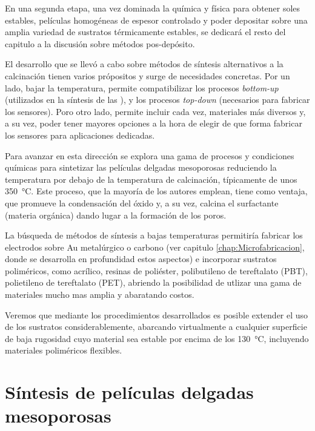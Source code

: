 	En una segunda etapa, una vez dominada la química y física para obtener soles estables, películas homogéneas de espesor controlado y poder depositar sobre una amplia variedad de sustratos térmicamente estables, se dedicará el resto del capitulo a la discusión sobre métodos pos-depósito. 

	El desarrollo que se llevó a cabo sobre métodos de síntesis alternativos a la calcinación tienen varios própositos y surge de necesidades concretas. Por un lado, bajar la temperatura, permite compatibilizar los procesos \textit{bottom-up} (utilizados en la síntesis de las \pdm), y los procesos \textit{top-down} (necesarios para fabricar los sensores). Poro otro lado, permite incluir cada vez, materiales más diversos y, a su vez, poder tener mayores opciones a la hora de elegir de que forma fabricar los sensores para aplicaciones dedicadas\cite{Doshi2000a,Wagner2013,Innocenzi2013,Soler-Illia2002a}.

	Para avanzar en esta dirección se explora una gama de procesos y condiciones químicas para sintetizar las películas delgadas mesoporosas reduciendo la temperatura por debajo de la temperatura de calcinación, típicamente de unos \SI{350}{\celsius}. Este proceso, que la mayoría de los autores emplean, tiene como ventaja, que promueve la condensación del óxido y, a su vez, calcina el surfactante (materia orgánica) dando lugar a la formación de los poros.\cite{Zhang2015,Horiuchi2011,Clark2000,Zhang2005}

	La búsqueda de métodos de síntesis a bajas temperaturas permitiría fabricar los electrodos sobre Au metalúrgico o carbono (ver capitulo \ref{chap:Microfabricacion}, donde se desarrolla en profundidad estos aspectos) e incorporar sustratos poliméricos, como acrílico, resinas de poliéster, polibutileno de tereftalato (PBT), polietileno de tereftalato (PET), abriendo la posibilidad de utlizar una gama de materiales mucho mas amplia y abaratando costos.

	Veremos que mediante los procedimientos desarrollados es posible extender el uso de los sustratos considerablemente, abarcando virtualmente a cualquier superficie de baja rugosidad cuyo material sea estable por encima de los \SI{130}{\celsius}, incluyendo materiales poliméricos flexibles.
		
\section{Síntesis de películas delgadas mesoporosas}
		
